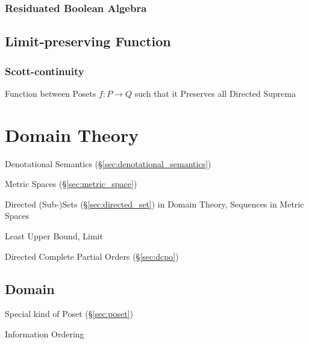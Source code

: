 \subsubsection{Residuated Boolean Algebra}
\label{sec:residuated_boolean_algebra}



\subsection{Limit-preserving Function}\label{sec:limit_preserving}

\subsubsection{Scott-continuity}\label{sec:scott_continuity}

Function between Posets $f : P \rightarrow Q$ such that it Preserves
all Directed Suprema %



\section{Domain Theory}\label{sec:domain_theory}

Denotational Semantics (\S\ref{sec:denotational_semantics})

Metric Spaces (\S\ref{sec:metric_space})

Directed (Sub-)Sets (\S\ref{sec:directed_set}) in Domain Theory,
Sequences in Metric Spaces

Least Upper Bound, Limit

Directed Complete Partial Orders (\S\ref{sec:dcpo})



\subsection{Domain}\label{sec:order_domain}

Special kind of Poset (\S\ref{sec:poset})

Information Ordering



